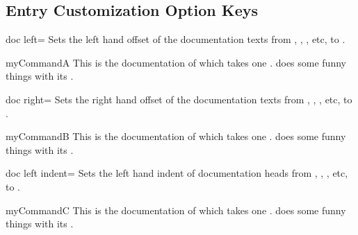 \clearpage
\subsection{Entry Customization Option Keys}


\begin{docTcbKey}{doc left}{=}{\tcbdocdescInit{2em}}
  Sets the left hand offset of the documentation texts from
  , , , etc, to .
\begin{dispExample}
\begin{docCommand*}[doc left=2cm,doc left indent=-2cm]{myCommandA}{}
  This is the documentation of  which takes one .
   does some funny things with its .
\end{docCommand*}
\end{dispExample}
\end{docTcbKey}

\begin{docTcbKey}{doc right}{=}{\tcbdocdescInit{0em}}
  Sets the right hand offset of the documentation texts from
  , , , etc, to .
\begin{dispExample}
\begin{docCommand*}[doc right=2cm]{myCommandB}{}
  This is the documentation of  which takes one .
   does some funny things with its .
\end{docCommand*}
\end{dispExample}
\end{docTcbKey}

\begin{docTcbKey}{doc left indent}{=}{\tcbdocdescInit{-2em}}
  Sets the left hand indent of documentation heads from
  , , , etc, to .
\begin{dispExample}
\begin{docCommand*}[doc left indent=2cm]{myCommandC}{}
  This is the documentation of  which takes one .
   does some funny things with its .
\end{docCommand*}
\end{dispExample}
\end{docTcbKey}


